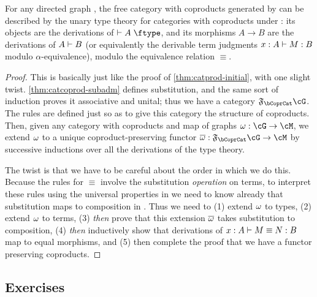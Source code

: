 \begin{thm}\label{thm:catcoprod-initial}
  For any directed graph \cG, the free category with coproducts generated by \cG can be described by the unary type theory for categories with coproducts under \cG: its objects are the derivations of $\types A\type$, and its morphisms $A\to B$ are the derivations of $A\vdash B$ (or equivalently the derivable term judgments $x:A \vdash M:B$ modulo $\alpha$-equivalence), modulo the equivalence relation $\equiv$.
\end{thm}
\begin{proof}
  This is basically just like the proof of \cref{thm:catprod-initial}, with one slight twist.
  \cref{thm:catcoprod-subadm} defines substitution, and the same sort of induction proves it associative and unital; thus we have a category $\F\bCoprCat\cG$.
  The rules are defined just so as to give this category the structure of coproducts.
  Then, given any category with coproducts \cM and map of graphs $\pfree:\cG\to\cM$, we extend $\omega$ to a unique coproduct-preserving functor $\free:\F\bCoprCat\cG\to\cM$ by successive inductions over all the derivations of the type theory.

  The twist is that we have to be careful about the order in which we do this.
  Because the rules for $\equiv$ involve the substitution \emph{operation} on terms, to interpret these rules using the universal properties in \cM we need to know already that substitution maps to composition in \cM.
  Thus we need to (1) extend $\omega$ to types, (2) extend $\omega$ to terms, (3) \emph{then} prove that this extension $\overline{\omega}$ takes substitution to composition, (4) \emph{then} inductively show that derivations of $x:A\vdash M\equiv N:B$ map to equal morphisms, and (5) then complete the proof that we have a functor preserving coproducts.
\end{proof}



\subsection*{Exercises}

